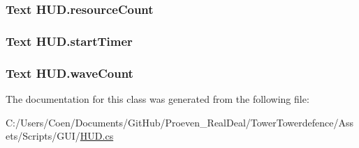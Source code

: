 \subsubsection[{\texorpdfstring{resource\+Count}{resourceCount}}]{\setlength{\rightskip}{0pt plus 5cm}Text H\+U\+D.\+resource\+Count}\hypertarget{class_h_u_d_a8042fe04161ecadbcf45cbd67501916b}{}\label{class_h_u_d_a8042fe04161ecadbcf45cbd67501916b}
\subsubsection[{\texorpdfstring{start\+Timer}{startTimer}}]{\setlength{\rightskip}{0pt plus 5cm}Text H\+U\+D.\+start\+Timer}\hypertarget{class_h_u_d_ad39ce4b22b494b211b98dedfda8b7523}{}\label{class_h_u_d_ad39ce4b22b494b211b98dedfda8b7523}
\subsubsection[{\texorpdfstring{wave\+Count}{waveCount}}]{\setlength{\rightskip}{0pt plus 5cm}Text H\+U\+D.\+wave\+Count}\hypertarget{class_h_u_d_ae2c047b8449f61ae1ff47e8a3c5d0762}{}\label{class_h_u_d_ae2c047b8449f61ae1ff47e8a3c5d0762}


The documentation for this class was generated from the following file\+:\begin{DoxyCompactItemize}
\item 
C\+:/\+Users/\+Coen/\+Documents/\+Git\+Hub/\+Proeven\+\_\+\+Real\+Deal/\+Tower\+Towerdefence/\+Assets/\+Scripts/\+G\+U\+I/\hyperlink{_h_u_d_8cs}{H\+U\+D.\+cs}\end{DoxyCompactItemize}
